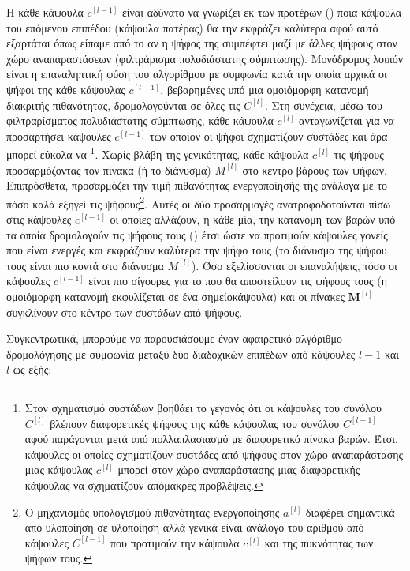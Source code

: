 Η κάθε κάψουλα $c^{[l-1]}$ είναι αδύνατο να γνωρίζει εκ των προτέρων () ποια κάψουλα του επόμενου επιπέδου (κάψουλα πατέρας) θα την εκφράζει καλύτερα αφού αυτό εξαρτάται όπως είπαμε από το αν η ψήφος της συμπέφτει μαζί με άλλες ψήφους στον χώρο αναπαραστάσεων (φιλτράρισμα πολυδιάστατης σύμπτωσης). Μονόδρομος λοιπόν είναι η επαναληπτική φύση του αλγορίθμου με συμφωνία κατά την οποία αρχικά οι ψήφοι της κάθε κάψουλας $c^{[l-1]}$, βεβαρημένες υπό μια ομοιόμορφη κατανομή διακριτής πιθανότητας, δρομολογούνται σε όλες τις $C^{[l]}$. Στη συνέχεια, μέσω του φιλτραρίσματος πολυδιάστατης σύμπτωσης, κάθε κάψουλα $c^{[l]}$ ανταγωνίζεται για να προσαρτήσει κάψουλες $c^{[l-1]}$ των οποίον οι ψήφοι σχηματίζουν συστάδες και άρα μπορεί εύκολα να \footnote{Στον σχηματισμό συστάδων βοηθάει το γεγονός ότι οι κάψουλες του συνόλου $C^{[l]}$ βλέπουν διαφορετικές  ψήφους της κάθε κάψουλας του συνόλου $C^{[l-1]}$ αφού παράγονται μετά από πολλαπλασιασμό με διαφορετικό πίνακα βαρών. Έτσι, κάψουλες οι οποίες σχηματίζουν συστάδες από ψήφους στον χώρο αναπαράστασης μιας κάψουλας $c^{[l]}$ μπορεί στον χώρο αναπαράστασης μιας διαφορετικής κάψουλας να σχηματίζουν απόμακρες προβλέψεις.}. Χωρίς βλάβη της γενικότητας, κάθε κάψουλα $c^{[l]}$  τις ψήφους προσαρμόζοντας τον πίνακα (ή το διάνυσμα) $M^{[l]}$ στο κέντρο βάρους των ψήφων. Επιπρόσθετα, προσαρμόζει την τιμή πιθανότητας ενεργοποίησής της ανάλογα με το πόσο καλά εξηγεί τις ψήφους\footnote{Ο μηχανισμός υπολογισμού πιθανότητας ενεργοποίησης $a^{[l]}$ διαφέρει σημαντικά από υλοποίηση σε υλοποίηση αλλά γενικά είναι ανάλογο του αριθμού από κάψουλες $C^{[l-1]}$ που προτιμούν την κάψουλα $c^{[l]}$ και της πυκνότητας των ψήφων τους.}. Αυτές οι δύο προσαρμογές ανατροφοδοτούνται πίσω στις κάψουλες $c^{[l-1]}$ οι οποίες αλλάζουν, η κάθε μία, την κατανομή των βαρών υπό τα οποία δρομολογούν τις ψήφους τους () έτσι ώστε να προτιμούν κάψουλες γονείς που είναι ενεργές και εκφράζουν καλύτερα την ψήφο τους (το διάνυσμα της ψήφου τους είναι πιο κοντά στο διάνυσμα $M^{[l]}$). Όσο εξελίσσονται οι επαναλήψεις, τόσο οι κάψουλες $c^{[l-1]}$ είναι πιο σίγουρες για το που θα αποστείλουν τις ψήφους τους (η ομοιόμορφη κατανομή εκφυλίζεται σε ένα σημείο\textendash κάψουλα) και οι πίνακες $\boldsymbol{M}^{[l]}$ συγκλίνουν στο κέντρο των συστάδων από ψήφους.\par

Συγκεντρωτικά, μπορούμε να παρουσιάσουμε έναν αφαιρετικό αλγόριθμο δρομολόγησης με συμφωνία μεταξύ δύο διαδοχικών επιπέδων από κάψουλες $l-1$ και $l$ ως εξής:

